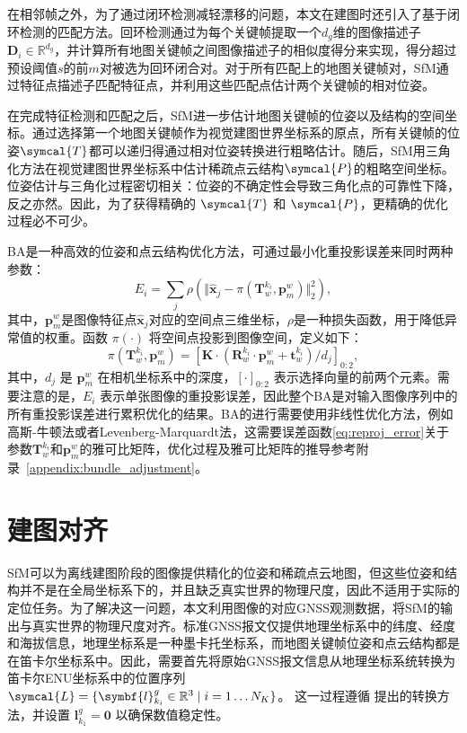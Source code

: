 在相邻帧之外，为了通过闭环检测减轻漂移的问题，本文在建图时还引入了基于闭环检测的匹配方法。回环检测通过为每个关键帧提取一个$d_g$维的图像描述子$\symbf{D}_i \in \mathbb{R}^{d_g}$，并计算所有地图关键帧之间图像描述子的相似度得分来实现，得分超过预设阈值$s$的前$m$对被选为回环闭合对。对于所有匹配上的地图关键帧对，SfM通过特征点描述子匹配特征点，并利用这些匹配点估计两个关键帧的相对位姿。

在完成特征检测和匹配之后，SfM进一步估计地图关键帧的位姿以及结构的空间坐标。通过选择第一个地图关键帧作为视觉建图世界坐标系的原点，所有关键帧的位姿$\symcal{T}$都可以递归得通过相对位姿转换进行粗略估计。随后，SfM用三角化方法在视觉建图世界坐标系中估计稀疏点云结构$\symcal{P}$的粗略空间坐标。位姿估计与三角化过程密切相关：位姿的不确定性会导致三角化点的可靠性下降，反之亦然。因此，为了获得精确的 $\symcal{T}$ 和 $\symcal{P}$，更精确的优化过程必不可少。

BA是一种高效的位姿和点云结构优化方法，可通过最小化重投影误差来同时两种参数：
\begin{equation}
\label{eq:reproj_error}
E_i = \sum_{j}\rho(\Vert \hat{\symbf{x}}_j - \pi(\symbf{T}^{k_i}_w, \symbf{p}_{m}^{w}) \Vert ^2_2),
\end{equation}
其中，$\symbf{p}_{m}^{w}$是图像特征点$\hat{\symbf{x}}_j$对应的空间点三维坐标，$\rho$是一种损失函数，用于降低异常值的权重。函数 $\pi(\cdot)$ 将空间点投影到图像空间，定义如下：
\begin{equation}
\label{eq:proj_func}
\pi(\symbf{T}^{k_i}_w, \symbf{p}_{m}^{w}) = [\symbf{K}\cdot(\symbf{R}_w^{k_i}\cdot\symbf{p}_{m}^{w}+\symbf{t}_w^{k_i})/d_j]_{0:2},
\end{equation}
其中，$d_j$ 是 $\symbf{p}_{m}^{w}$ 在相机坐标系中的深度，$[\cdot]_{0:2}$ 表示选择向量的前两个元素。需要注意的是，$E_i$ 表示单张图像的重投影误差，因此整个BA是对输入图像序列中的所有重投影误差进行累积优化的结果。BA的进行需要使用非线性优化方法，例如高斯-牛顿法或者Levenberg-Marquardt法，这需要误差函数\eqref{eq:reproj_error}关于参数$\symbf{T}^{k_i}_w$和$\symbf{p}_{m}^{w}$的雅可比矩阵，优化过程及雅可比矩阵的推导参考附录~\ref{appendix:bundle_adjustment}。


\section{建图对齐}

SfM可以为离线建图阶段的图像提供精化的位姿和稀疏点云地图，但这些位姿和结构并不是在全局坐标系下的，并且缺乏真实世界的物理尺度，因此不适用于实际的定位任务。为了解决这一问题，本文利用图像的对应GNSS观测数据，将SfM的输出与真实世界的物理尺度对齐。标准GNSS报文仅提供地理坐标系中的纬度、经度和海拔信息，地理坐标系是一种墨卡托坐标系，而地图关键帧位姿和点云结构都是在笛卡尔坐标系中。因此，需要首先将原始GNSS报文信息从地理坐标系统转换为笛卡尔ENU坐标系中的位置序列
$\symcal{L} = \{\symbf{l}_{k_i}^g \in \mathbb{R}^3 \mid i=1 \ldots N_K \}$。
这一过程遵循\citet{subirana2011transformations} 提出的转换方法，并设置
$\symbf{l}_{k_1}^g = \symbf{0}$ 以确保数值稳定性。

